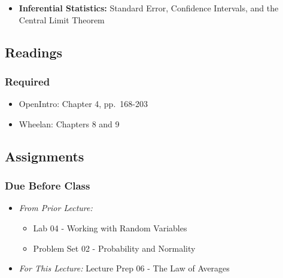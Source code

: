 \documentclass[]{book}
\providecommand{\tightlist}{%
  \setlength{\itemsep}{0pt}\setlength{\parskip}{0pt}}
\theoremstyle{definition}
\theoremstyle{definition}
\theoremstyle{definition}
\theoremstyle{remark}
\begin{document}
\begin{itemize}
\tightlist
\item
  \textbf{Inferential Statistics:} Standard Error, Confidence Intervals,
  and the Central Limit Theorem
\end{itemize}

\hypertarget{readings-7}{%
\subsection*{Readings}\label{readings-7}}

\hypertarget{required-7}{%
\subsubsection*{Required}\label{required-7}}

\begin{itemize}
\tightlist
\item
  OpenIntro: Chapter 4, pp.~168-203
\item
  Wheelan: Chapters 8 and 9
\end{itemize}

\hypertarget{assignments-7}{%
\subsection*{Assignments}\label{assignments-7}}

\hypertarget{due-before-class-5}{%
\subsubsection*{Due Before Class}\label{due-before-class-5}}

\begin{itemize}
\tightlist
\item
  \emph{From Prior Lecture:}

  \begin{itemize}
  \tightlist
  \item
    Lab 04 - Working with Random Variables
  \item
    Problem Set 02 - Probability and Normality
  \end{itemize}
\item
  \emph{For This Lecture:} Lecture Prep 06 - The Law of Averages
\end{itemize}
\end{document}
